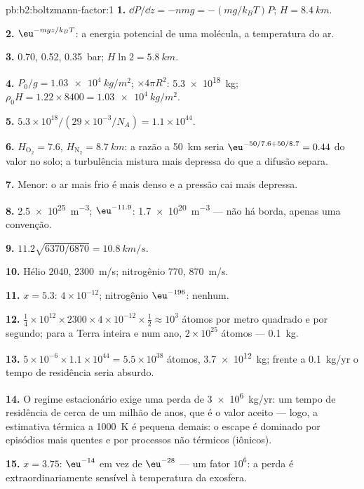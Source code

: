 \begin{solution}{pb:b2:boltzmann-factor:1}
\textbf{1.} $\dd P/\dd z = -nmg = -(mg/k_BT)P$; $H = \qty{8.4}{km}$.

\textbf{2.} $\eu^{-mgz/k_BT}$: a energia potencial de uma molécula, a
temperatura do ar.

\textbf{3.} \qty{0.70}{}, \qty{0.52}{}, \qty{0.35}{bar}; $H\ln 2 = \qty{5.8}{km}$.

\textbf{4.} $P_0/g = \qty{1.03e4}{kg/m^2}$; $\times 4\pi R^2$: \qty{5.3e18}{kg}; $\rho_0H =
1.22 \times 8400 = \qty{1.03e4}{kg/m^2}$.

\textbf{5.} $5.3 \times 10^{18}/(29 \times 10^{-3}/N_A) = 1.1 \times 10^{44}$.

\textbf{6.} $H_{\text{O}_2} = 7.6$, $H_{\text{N}_2} = \qty{8.7}{km}$: a razão a \qty{50}{km}
seria $\eu^{-50/7.6 + 50/8.7} = 0.44$ do valor no solo; a turbulência mistura
mais depressa do que a difusão separa.

\textbf{7.} Menor: o ar mais frio é mais denso e a pressão cai mais depressa.

\textbf{8.} \qty{2.5e25}{m^{-3}}; $\eu^{-11.9}$: \qty{1.7e20}{m^{-3}} --- não há borda, apenas uma
convenção.

\textbf{9.} $11.2\sqrt{6370/6870} = \qty{10.8}{km/s}$.

\textbf{10.} Hélio \qty{2040}{}, \qty{2300}{m/s}; nitrogênio \qty{770}{}, \qty{870}{m/s}.

\textbf{11.} $x = 5.3$: $4 \times 10^{-12}$; nitrogênio $\eu^{-196}$: nenhum.

\textbf{12.} $\tfrac14 \times 10^{12} \times 2300 \times 4 \times 10^{-12} \times \tfrac12 \approx
10^3$ átomos por metro quadrado e por segundo; para a Terra inteira e num ano,
$2 \times 10^{25}$ átomos --- \qty{0.1}{kg}.

\textbf{13.} $5 \times 10^{-6} \times 1.1 \times 10^{44} = 5.5 \times 10^{38}$ átomos, \qty{3.7e12}{kg};
frente a \qty{0.1}{kg/yr} o tempo de residência seria absurdo.

\textbf{14.} O regime estacionário exige uma perda de \qty{3e6}{kg/yr}: um tempo
de residência de cerca de um milhão de anos, que é o valor aceito --- logo, a
estimativa térmica a \qty{1000}{K} é pequena demais: o escape é
dominado por episódios mais quentes e por processos não térmicos (iônicos).

\textbf{15.} $x = 3.75$: $\eu^{-14}$ em vez de $\eu^{-28}$ --- um fator $10^6$:
a perda é extraordinariamente sensível à temperatura da exosfera.


\end{solution}
